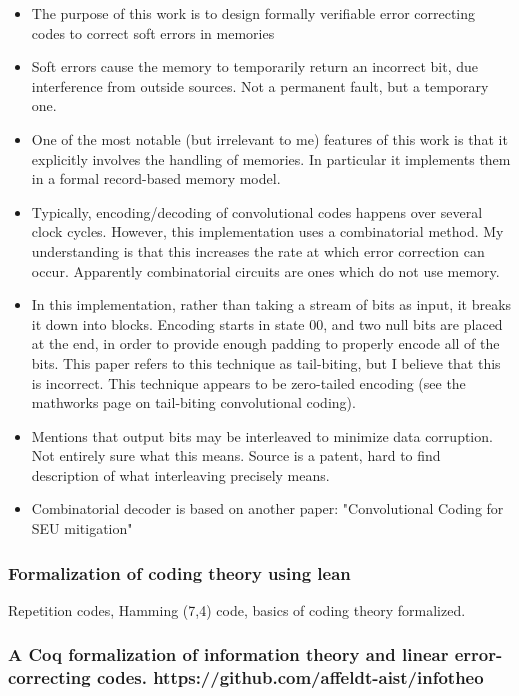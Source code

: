 \documentclass{article}
\begin{document}
\begin{itemize}
\item The purpose of this work is to design formally verifiable error correcting
codes to correct soft errors in memories

\item Soft errors cause the memory to temporarily return an incorrect bit, due
interference from outside sources. Not a permanent fault, but a temporary one.

\item One of the most notable (but irrelevant to me) features of this work is
that it explicitly involves the handling of memories. In particular it
implements them in a formal record-based memory model.

\item Typically, encoding/decoding of convolutional codes happens over several
clock cycles. However, this implementation uses a combinatorial method.
My understanding is that this increases the rate at which error correction
can occur. Apparently combinatorial circuits are ones which do not use memory.

\item In this implementation, rather than taking a stream of bits as input, it
breaks it down into blocks. Encoding starts in state 00, and two null bits
are placed at the end, in order to provide enough padding to properly
encode all of the bits. This paper refers to this technique as tail-biting,
but I believe that this is incorrect. This technique appears to be
zero-tailed encoding (see the mathworks page on tail-biting convolutional
coding).

\item Mentions that output bits may be interleaved to minimize data corruption.
Not entirely sure what this means. Source is a patent, hard to find
description of what interleaving precisely means.

\item Combinatorial decoder is based on another paper: "Convolutional Coding for SEU
mitigation"
\end{itemize}

\subsubsection{Formalization of coding theory using lean}

Repetition codes, Hamming (7,4) code, basics of coding theory formalized.

\subsubsection{A Coq formalization of information theory and linear error-correcting codes. https://github.com/affeldt-aist/infotheo}
\end{document}
